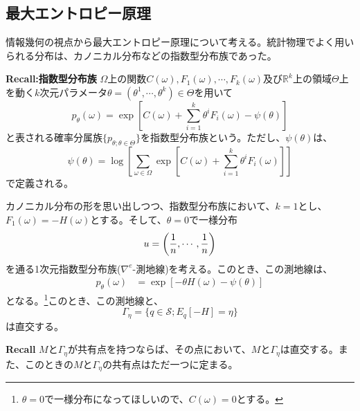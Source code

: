 \documentclass[a4paper,11pt]{jsarticle}
\numberwithin{equation}{section}
\begin{document}
\subsection{最大エントロピー原理}
情報幾何の視点から最大エントロピー原理について考える。統計物理でよく用いられる分布は、カノニカル分布などの指数型分布族であった。

\begin{itembox}[l]{\textbf{Recall:指数型分布族}}
    $\Omega$上の関数$C(\omega),F_1(\omega),\cdots,F_k(\omega)$及び$\mathbb{R}^k$上の領域$\Theta$上を動く$k$次元パラメータ$\theta = (\theta^1,\cdots,\theta^k) \in \Theta$を用いて
    \begin{equation}
        p_{\theta}(\omega) = \exp\left[ C(\omega) + \sum_{i=1}^{k} \theta^i F_i(\omega) - \psi(\theta) \right]
    \end{equation}
    と表される確率分属族$\{p_{\theta;\theta \in \Theta}\}$を指数型分布族という。ただし、$\psi(\theta)$は、
    \begin{equation}
        \psi(\theta) = \log \left[ \sum_{\omega \in \Omega} \exp\left[ C(\omega) + \sum_{i=1}^{k} \theta^i F_i(\omega) \right] \right]
    \end{equation}
    で定義される。
\end{itembox}

カノニカル分布の形を思い出しつつ、指数型分布族において、$k=1$とし、$F_1(\omega) = -H(\omega)$とする。そして、$\theta = 0$で一様分布
\begin{equation}
    u = \qty(\frac{1}{n},\cdots,\frac{1}{n})
\end{equation}
を通る1次元指数型分布族($\nabla^{e}$-測地線)を考える。このとき、この測地線は、
\begin{align}
    p_{\theta}(\omega) &= \exp\left[ -\theta H(\omega) - \psi(\theta) \right]
\end{align}
となる。\footnote{$\theta = 0$で一様分布になってほしいので、$C(\omega)=0$とする。}このとき、この測地線と、
\begin{equation}
    \Gamma_{\eta} = \{q \in \mathcal{S}; E_q[-H] = \eta \}
\end{equation}
は直交する。

\begin{itembox}[l]{\textbf{Recall}}
    $M$と$\Gamma_{\eta}$が共有点を持つならば、その点において、$M$と$\Gamma_{\eta}$は直交する。また、このときの$M$と$\Gamma_{\eta}$の共有点はただ一つに定まる。
\end{itembox}
\end{document}
